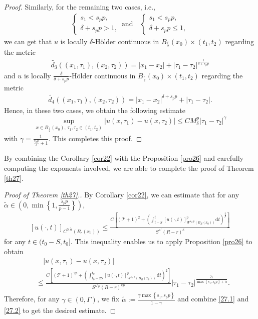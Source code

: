 \documentclass[reqno,10pt]{amsart}
\numberwithin{equation}{section}
\begin{document}
\begin{proof}
	Similarly, for the remaining two cases, i.e.,
	\begin{align*}
		\begin{cases}
			s_1<s_pp,\\
			\delta+s_pp>1,
		\end{cases}\,\text{and}\quad
		\begin{cases}
			s_1<s_pp,\\
			\delta+s_pp\le1,
		\end{cases}
	\end{align*}
	we can get that $u$ is locally $\delta$-H\"{o}lder continuous in $B_\frac{r}{2}(x_0)\times(t_1,t_2)$ regarding the metric
	\begin{align*}
		\tilde{d_3}((x_1,\tau_1),(x_2,\tau_2))=|x_1-x_2|+|\tau_1-\tau_2|^\frac{1}{\delta+s_pp}
	\end{align*}
	and $u$ is locally $\frac{\delta}{\delta+s_pp}$-H\"{o}lder continuous in $B_\frac{r}{2}(x_0)\times(t_1,t_2)$ regarding the metric
	\begin{align*}
		\tilde{d_4}((x_1,\tau_1),(x_2,\tau_2))=|x_1-x_2|^{\delta+s_pp}+|\tau_1-\tau_2|.
	\end{align*}
	Hence,  in these two cases, we obtain the following estimate
	\begin{align*}
		\sup_{x\in B_{\frac{r}{2}}(x_0),\,\tau_1,\tau_2\in (t_1,t_2)}|u(x,\tau_1)-u(x,\tau_2)|\le CM^p_\delta|\tau_1-\tau_2|^\gamma
	\end{align*}
	with $\gamma=\frac{1}{\frac{s_pp}{\delta}+1}$. This completes this proof.
\end{proof}

By combining the Corollary \ref{cor22} with the Proposition \ref{pro26} and carefully computing the exponents involved, we are able to complete the proof of Theorem \ref{th27}.

\begin{proof}[Proof of Theorem \ref{th27}.]
	By Corollary \ref{cor22}, we can estimate that for any $\tilde{\alpha}\in \left( 0,\min\left\lbrace 1,\frac{s_pp}{p-1}\right\rbrace \right) $,
	\begin{align}
		\label{27.1}
		[u(\cdot, t)]_{C^{0,\tilde{\alpha}}(B_r(x_0))}\le \frac{C\left[ \left( \mathcal{T}+1\right)^2+\left( \int_{t-S}^{t}[u(\cdot,t)]^p_{W^{s_p,p}\left( B_R(x_0)\right)}\mathrm{d}t\right)^{\frac{2}{p}}\right] }{S^{\kappa'}(R-r)^{\kappa}}
	\end{align}
	for any $t\in(t_0-S,t_0]$. This inequality enables us to apply Proposition \ref{pro26} to obtain
	\begin{align}
		\label{27.2}
	&\quad	|u(x,\tau_1)-u(x,\tau_2)| \nonumber\\
		& \le \frac{C\left[ \left( \mathcal{T}+1\right)^{2p}+\left( \int_{t_0-2S}^{t_0}[u(\cdot,t)]^p_{W^{s_p, p}(B_R(x_0))}\,\mathrm{d}t\right) ^2\right] }{S^{\kappa'p}(R-r)^{\kappa p}}|\tau_1-\tau_2|^{\frac{\tilde{\alpha}}{\max\left\lbrace s_1, s_pp\right\rbrace+\tilde{\alpha}}}.
	\end{align}
	Therefore, for any $\gamma\in \left( 0,\Gamma\right)$, we fix $\tilde{\alpha}:=\frac{\gamma\max\left\lbrace s_1,s_pp\right\rbrace}{1-\gamma}$ and combine \eqref{27.1} and \eqref{27.2} to get the desired estimate.
\end{proof}
\end{document}
